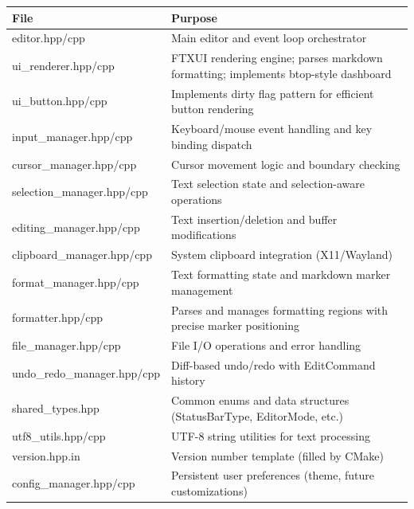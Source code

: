 \documentclass[12pt,a4paper,oneside,openany]{report}
\begin{document}
\begin{table}[H]
	\centering
	\begin{tabular}{|l|p{8cm}|}
		\hline
		\textbf{File}               & \textbf{Purpose}                                                                    \\
		\hline
		editor.hpp/cpp              & Main editor and event loop orchestrator                                             \\
		\hline
		ui\_renderer.hpp/cpp        & FTXUI rendering engine; parses markdown formatting; implements btop-style dashboard \\
		\hline
		ui\_button.hpp/cpp          & Implements dirty flag pattern for efficient button rendering                        \\
		\hline
		input\_manager.hpp/cpp      & Keyboard/mouse event handling and key binding dispatch                              \\
		\hline
		cursor\_manager.hpp/cpp     & Cursor movement logic and boundary checking                                         \\
		\hline
		selection\_manager.hpp/cpp  & Text selection state and selection-aware operations                                 \\
		\hline
		editing\_manager.hpp/cpp    & Text insertion/deletion and buffer modifications                                    \\
		\hline
		clipboard\_manager.hpp/cpp  & System clipboard integration (X11/Wayland)                                          \\
		\hline
		format\_manager.hpp/cpp     & Text formatting state and markdown marker management                                \\
		\hline
		formatter.hpp/cpp           & Parses and manages formatting regions with precise marker positioning               \\
		\hline
		file\_manager.hpp/cpp       & File I/O operations and error handling                                              \\
		\hline
		undo\_redo\_manager.hpp/cpp & Diff-based undo/redo with EditCommand history                                       \\
		\hline
		shared\_types.hpp           & Common enums and data structures (StatusBarType, EditorMode, etc.)                  \\
		\hline
		utf8\_utils.hpp/cpp         & UTF-8 string utilities for text processing                                          \\
		\hline
		version.hpp.in              & Version number template (filled by CMake)                                           \\
		\hline
		config\_manager.hpp/cpp     & Persistent user preferences (theme, future customizations)                          \\
		\hline
	\end{tabular}
\end{table}
\end{document}
